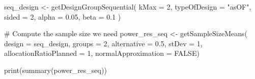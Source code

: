 \documentclass[
  letterpaper,
  DIV=11,
  numbers=noendperiod]{scrreprt}
\newenvironment{Shaded}{\begin{snugshade}}{\end{snugshade}}
\newcommand{\AttributeTok}[1]{\textcolor[rgb]{0.40,0.45,0.13}{#1}}
\newcommand{\CommentTok}[1]{\textcolor[rgb]{0.37,0.37,0.37}{#1}}
\newcommand{\ConstantTok}[1]{\textcolor[rgb]{0.56,0.35,0.01}{#1}}
\newcommand{\DecValTok}[1]{\textcolor[rgb]{0.68,0.00,0.00}{#1}}
\newcommand{\FloatTok}[1]{\textcolor[rgb]{0.68,0.00,0.00}{#1}}
\newcommand{\FunctionTok}[1]{\textcolor[rgb]{0.28,0.35,0.67}{#1}}
\newcommand{\NormalTok}[1]{\textcolor[rgb]{0.00,0.23,0.31}{#1}}
\newcommand{\OtherTok}[1]{\textcolor[rgb]{0.00,0.23,0.31}{#1}}
\newcommand{\StringTok}[1]{\textcolor[rgb]{0.13,0.47,0.30}{#1}}
\begin{document}
\begin{Shaded}
\begin{Highlighting}[]
\NormalTok{seq\_design }\OtherTok{\textless{}{-}} \FunctionTok{getDesignGroupSequential}\NormalTok{(}
  \AttributeTok{kMax =} \DecValTok{2}\NormalTok{,}
  \AttributeTok{typeOfDesign =} \StringTok{"asOF"}\NormalTok{,}
  \AttributeTok{sided =} \DecValTok{2}\NormalTok{,}
  \AttributeTok{alpha =} \FloatTok{0.05}\NormalTok{,}
  \AttributeTok{beta =} \FloatTok{0.1}
\NormalTok{  )}

\CommentTok{\# Compute the sample size we need}
\NormalTok{power\_res\_seq }\OtherTok{\textless{}{-}} \FunctionTok{getSampleSizeMeans}\NormalTok{(}
  \AttributeTok{design =}\NormalTok{ seq\_design,}
  \AttributeTok{groups =} \DecValTok{2}\NormalTok{,}
  \AttributeTok{alternative =} \FloatTok{0.5}\NormalTok{, }
  \AttributeTok{stDev =} \DecValTok{1}\NormalTok{, }
  \AttributeTok{allocationRatioPlanned =} \DecValTok{1}\NormalTok{,}
  \AttributeTok{normalApproximation =} \ConstantTok{FALSE}\NormalTok{)}

\FunctionTok{print}\NormalTok{(}\FunctionTok{summary}\NormalTok{(power\_res\_seq))}
\end{Highlighting}
\end{Shaded}
\end{document}
